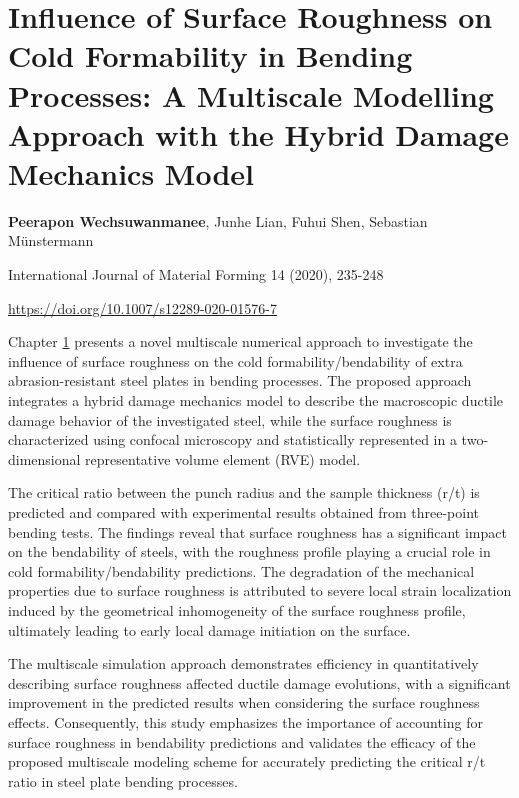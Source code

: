 \chapter[roughness]{Influence of Surface Roughness on Cold Formability in Bending Processes: A Multiscale Modelling Approach with the Hybrid Damage Mechanics Model}\label{ch:roughness}
\begin{center}

    \textbf{Peerapon Wechsuwanmanee}, Junhe Lian, Fuhui Shen, Sebastian Münstermann
    
    \vspace{20pt}
    
    International Journal of Material Forming 14 (2020), 235-248
    
    \vspace{20pt}
    
    \url{https://doi.org/10.1007/s12289-020-01576-7}
    
    \vspace{40pt}
    
\end{center}
Chapter \ref{ch:roughness} presents a novel multiscale numerical approach to investigate the influence of surface roughness on the cold formability/bendability of extra abrasion-resistant steel plates in bending processes. The proposed approach integrates a hybrid damage mechanics model to describe the macroscopic ductile damage behavior of the investigated steel, while the surface roughness is characterized using confocal microscopy and statistically represented in a two-dimensional representative volume element (RVE) model.

The critical ratio between the punch radius and the sample thickness (r/t) is predicted and compared with experimental results obtained from three-point bending tests. The findings reveal that surface roughness has a significant impact on the bendability of steels, with the roughness profile playing a crucial role in cold formability/bendability predictions. The degradation of the mechanical properties due to surface roughness is attributed to severe local strain localization induced by the geometrical inhomogeneity of the surface roughness profile, ultimately leading to early local damage initiation on the surface.

The multiscale simulation approach demonstrates efficiency in quantitatively describing surface roughness affected ductile damage evolutions, with a significant improvement in the predicted results when considering the surface roughness effects. Consequently, this study emphasizes the importance of accounting for surface roughness in bendability predictions and validates the efficacy of the proposed multiscale modeling scheme for accurately predicting the critical r/t ratio in steel plate bending processes.
